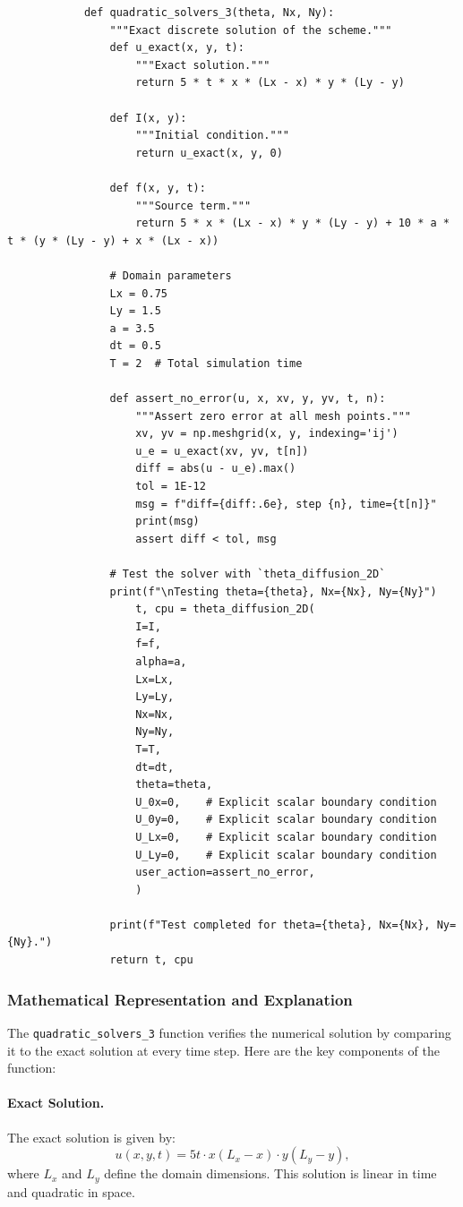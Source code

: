 \documentclass{article}
\begin{document}
		\begin{lstlisting}
			def quadratic_solvers_3(theta, Nx, Ny):
				"""Exact discrete solution of the scheme."""
				def u_exact(x, y, t):
					"""Exact solution."""
					return 5 * t * x * (Lx - x) * y * (Ly - y)
				
				def I(x, y):
					"""Initial condition."""
					return u_exact(x, y, 0)
					
				def f(x, y, t):
					"""Source term."""
					return 5 * x * (Lx - x) * y * (Ly - y) + 10 * a * t * (y * (Ly - y) + x * (Lx - x))
				
				# Domain parameters
				Lx = 0.75
				Ly = 1.5
				a = 3.5
				dt = 0.5
				T = 2  # Total simulation time
				
				def assert_no_error(u, x, xv, y, yv, t, n):
					"""Assert zero error at all mesh points."""
					xv, yv = np.meshgrid(x, y, indexing='ij')
					u_e = u_exact(xv, yv, t[n])
					diff = abs(u - u_e).max()
					tol = 1E-12
					msg = f"diff={diff:.6e}, step {n}, time={t[n]}"
					print(msg)
					assert diff < tol, msg
				
				# Test the solver with `theta_diffusion_2D`
				print(f"\nTesting theta={theta}, Nx={Nx}, Ny={Ny}")
					t, cpu = theta_diffusion_2D(
					I=I,
					f=f,
					alpha=a,
					Lx=Lx,
					Ly=Ly,
					Nx=Nx,
					Ny=Ny,
					T=T,
					dt=dt,
					theta=theta,
					U_0x=0,    # Explicit scalar boundary condition
					U_0y=0,    # Explicit scalar boundary condition
					U_Lx=0,    # Explicit scalar boundary condition
					U_Ly=0,    # Explicit scalar boundary condition
					user_action=assert_no_error,
					)
				
				print(f"Test completed for theta={theta}, Nx={Nx}, Ny={Ny}.")
				return t, cpu
		\end{lstlisting}
		
		\subsubsection{Mathematical Representation and Explanation}
		
		The \texttt{quadratic\_solvers\_3} function verifies the numerical solution by comparing it to the exact solution at every time step. Here are the key components of the function:
		
		\paragraph{Exact Solution.}
		The exact solution is given by:
		\[
		u(x, y, t) = 5t \cdot x(L_x - x) \cdot y(L_y - y),
		\]
		where \( L_x \) and \( L_y \) define the domain dimensions. This solution is linear in time and quadratic in space.
		
\end{document}

